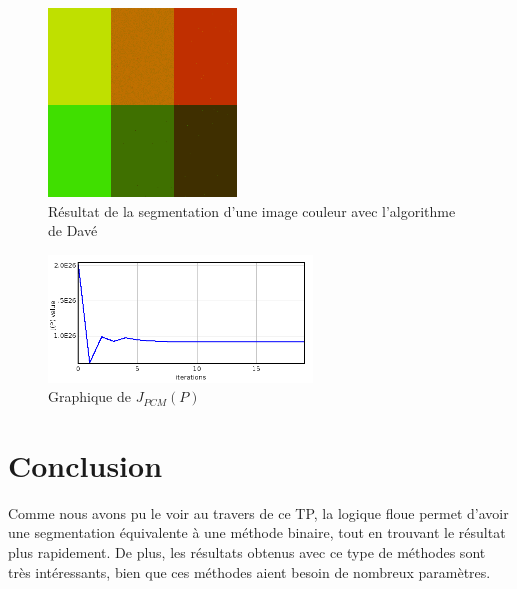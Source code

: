 \documentclass[a4paper,11pt]{article}
\begin{document}
\begin{figure}[!h]
  \begin{center}
    \includegraphics[width=5cm]{resultat/DAV.png}
    \caption{Résultat de la segmentation d'une image couleur avec l'algorithme de Davé}
    \label{fig:dave}
  \end{center}
\end{figure}

\begin{figure}[!h]
  \begin{center}
    \includegraphics[width=7cm]{resultat/DAV_graph.png}
    \caption{Graphique de $J_{PCM}(P)$}
    \label{fig:graphDAVE}
  \end{center}
\end{figure}

\newpage
\section{Conclusion}
Comme nous avons pu le voir au travers de ce TP, la logique floue permet d'avoir 
une segmentation équivalente à une méthode binaire, tout en trouvant le résultat 
plus rapidement. De plus, les résultats obtenus avec ce type de méthodes sont très 
intéressants, bien que ces méthodes aient besoin de nombreux paramètres.
  
\end{document}
